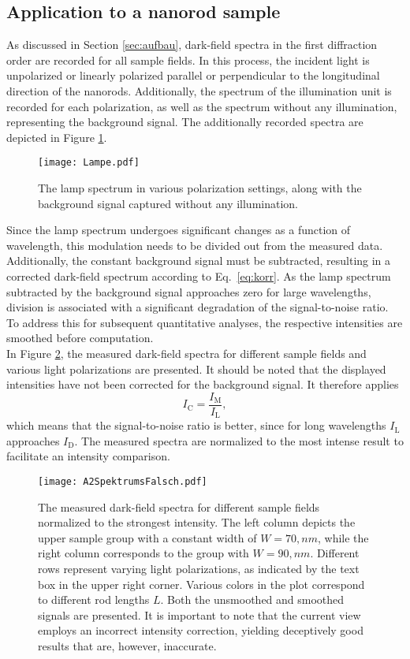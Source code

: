 \subsection{\label{sec:A2}Application to a nanorod sample}
As discussed in Section \ref{sec:aufbau}, dark-field spectra in the first diffraction 
order are recorded for all sample fields. 
In this process, the incident light is unpolarized or linearly polarized parallel or perpendicular 
to the longitudinal direction of the nanorods. 
Additionally, the spectrum of the illumination unit is recorded for each polarization, 
as well as the spectrum without any illumination, representing the background signal. 
The additionally recorded spectra are depicted in Figure \ref{fig:lampe}.
\begin{figure}[h!]
    \centering
    \texttt{[image: Lampe.pdf]}
    \caption{\label{fig:lampe}The lamp spectrum in various polarization settings, 
    along with the background signal captured without any illumination.}
\end{figure}\FloatBarrier
Since the lamp spectrum undergoes significant changes as a function of wavelength, 
this modulation needs to be divided out from the measured data. 
Additionally, the constant background signal must be subtracted, resulting in a corrected 
dark-field spectrum according to Eq.~\eqref{eq:korr}. 
As the lamp spectrum subtracted by the background signal approaches zero for large wavelengths, 
division is associated with a significant degradation of the signal-to-noise ratio. 
To address this for subsequent quantitative analyses, the respective intensities 
are smoothed before computation. \\
In Figure \ref{fig:spektren1}, the measured dark-field spectra for different sample 
fields and various light polarizations are presented. 
It should be noted that the displayed intensities have not been corrected for the background signal.
It therefore applies
\begin{equation}
    I_{\text{C}} = \frac{I_{\text{M}}}{I_{\text{L}}},
\end{equation} 
which means that the signal-to-noise ratio is better, since for long wavelengths 
$I_{\text{L}}$ approaches $I_{\text{D}}$.
The measured spectra are normalized to the most intense result to facilitate an intensity comparison.
\begin{figure}[h!]
    \centering
    \texttt{[image: A2SpektrumsFalsch.pdf]}
    \caption{\label{fig:spektren1}
    The measured dark-field spectra for different sample fields normalized to the strongest 
    intensity. 
    The left column depicts the upper sample group with a constant width of $W=70,\si{nm}$, 
    while the right column corresponds to the group with $W=90,\si{nm}$. Different rows 
    represent varying light polarizations, as indicated by the text box in the upper right corner. 
    Various colors in the plot correspond to different rod lengths $L$. Both the unsmoothed 
    and smoothed signals are presented. It is important to note that the current view employs 
    an incorrect intensity correction, yielding deceptively good results that are, however, inaccurate.}
\end{figure} \FloatBarrier
